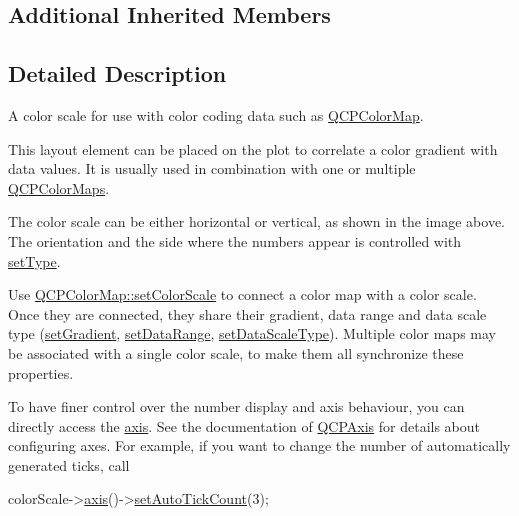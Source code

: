 \subsection*{Additional Inherited Members}


\subsection{Detailed Description}
A color scale for use with color coding data such as \hyperlink{class_q_c_p_color_map}{Q\+C\+P\+Color\+Map}. 

This layout element can be placed on the plot to correlate a color gradient with data values. It is usually used in combination with one or multiple \hyperlink{class_q_c_p_color_map}{Q\+C\+P\+Color\+Maps}.



The color scale can be either horizontal or vertical, as shown in the image above. The orientation and the side where the numbers appear is controlled with \hyperlink{class_q_c_p_color_scale_a1bf9bdb291927c422dd66b404b206f1f}{set\+Type}.

Use \hyperlink{class_q_c_p_color_map_aa828921db364fe3c6af4619580ab85fd}{Q\+C\+P\+Color\+Map\+::set\+Color\+Scale} to connect a color map with a color scale. Once they are connected, they share their gradient, data range and data scale type (\hyperlink{class_q_c_p_color_scale_a1f29583bb6f1e7f473b62fb712be3940}{set\+Gradient}, \hyperlink{class_q_c_p_color_scale_abe88633003a26d1e756aa74984587fef}{set\+Data\+Range}, \hyperlink{class_q_c_p_color_scale_aeb6107d67dd7325145b2498abae67fc3}{set\+Data\+Scale\+Type}). Multiple color maps may be associated with a single color scale, to make them all synchronize these properties.

To have finer control over the number display and axis behaviour, you can directly access the \hyperlink{class_q_c_p_color_scale_a1205bd67c8a33d5818aac1f6eea016a4}{axis}. See the documentation of \hyperlink{class_q_c_p_axis}{Q\+C\+P\+Axis} for details about configuring axes. For example, if you want to change the number of automatically generated ticks, call 
\begin{DoxyCode}
colorScale->\hyperlink{class_q_c_p_color_scale_a1205bd67c8a33d5818aac1f6eea016a4}{axis}()->\hyperlink{class_q_c_p_axis_a7c7111cbeac9ec5fcb40f93a1ef51a0b}{setAutoTickCount}(3);
\end{DoxyCode}


